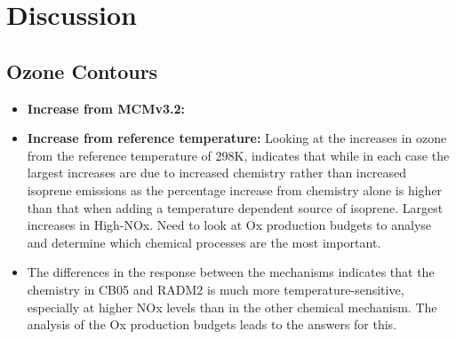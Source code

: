 \documentclass[11pt,a4paper]{article}
\begin{document}
\section{Discussion} \label{s:discussion}
\subsection{Ozone Contours}
\begin{itemize}
    \item \textbf{Increase from MCMv3.2:}
    \item \textbf{Increase from reference temperature:} Looking at the increases in ozone from the reference temperature of 298K, indicates that while in each case the largest increases are due to increased chemistry rather than increased isoprene emissions as the percentage increase from chemistry alone is higher than that when adding a temperature dependent source of isoprene. Largest increases in High-NOx. Need to look at Ox production budgets to analyse and determine which chemical processes are the most important.
    \item The differences in the response between the mechanisms indicates that the chemistry in CB05 and RADM2 is much more temperature-sensitive, especially at higher NOx levels than in the other chemical mechanism. The analysis of the Ox production budgets leads to the answers for this.
\end{itemize}
\end{document}
